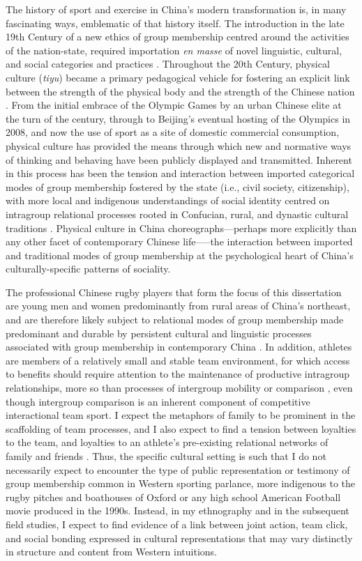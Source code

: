 The history of sport and exercise in China's modern transformation is, in many fascinating ways, emblematic of that history itself.  The introduction in the late 19th Century of a new ethics of group membership centred around the activities of the nation-state, required importation \textit{en masse} of novel linguistic, cultural, and social categories and practices \citep{Liu1995}.
Throughout the 20th Century, physical culture (\textit{tiyu}) became a primary pedagogical vehicle for fostering an explicit link between the strength of the physical body and the strength of the Chinese nation \cites[32]{Morris2004}[49]{Brownell1995}.  From the initial embrace of the Olympic Games by an urban Chinese elite at the turn of the century, through to Beijing's eventual hosting of the Olympics in 2008, and now the use of sport as a site of domestic commercial consumption, physical culture has provided the means through which new and normative ways of thinking and behaving have been publicly displayed and transmitted.
Inherent in this process has been the tension and interaction between imported categorical modes of group membership fostered by the state (i.e., civil society, citizenship), with more local and indigenous understandings of social identity centred on intragroup relational processes rooted in Confucian, rural, and dynastic cultural traditions \citep{Fei1992}.  Physical culture in China choreographs---perhaps more explicitly than any other facet of contemporary Chinese life—--the interaction between imported and traditional modes of group membership at the psychological heart of China's culturally-specific patterns of sociality.

The professional Chinese rugby players that form the focus of this dissertation are young men and women predominantly from rural areas of China's northeast, and are therefore likely subject to relational modes of group membership made predominant and durable by persistent cultural and linguistic processes associated with group membership in contemporary China \citep{Liu2009}.  In addition, athletes are members of a relatively small and stable team environment, for which access to benefits should require attention to the maintenance of productive intragroup relationships, more so than processes of intergroup mobility or comparison \citep{Schug2010}, even though intergroup comparison is an inherent component of competitive interactional team sport.
I expect the metaphors of family to be prominent in the scaffolding of team processes, and I also expect to find a tension between loyalties to the team, and loyalties to an athlete's pre-existing relational networks of family and friends \citep{Yang1994}.  Thus, the specific cultural setting is such that I do not necessarily expect to encounter the type of public representation or testimony of group membership common in Western sporting parlance, more indigenous to the rugby pitches and boathouses of Oxford or any high school American Football movie produced in the 1990s.  Instead, in my ethnography and in the subsequent field studies, I expect to find evidence of a link between joint action, team click, and social bonding expressed in cultural representations that may vary distinctly in structure and content from Western intuitions.

